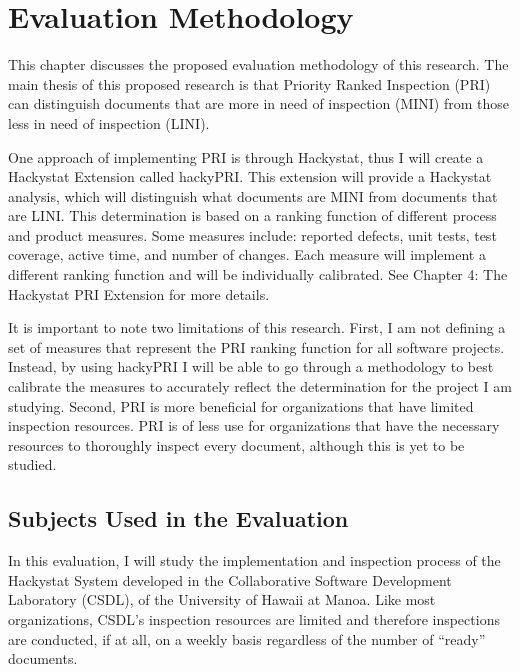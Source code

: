 

\chapter{Evaluation Methodology}
\label{chapter:evaluation}
This chapter discusses the proposed evaluation methodology of this
research. The main thesis of this proposed research is that Priority Ranked
Inspection (PRI) can distinguish documents that are more in need of
inspection (MINI) from those less in need of inspection (LINI).

One approach of implementing PRI is through Hackystat, thus I will create a
Hackystat Extension called hackyPRI. This extension will provide a
Hackystat analysis, which will distinguish what documents are MINI from
documents that are LINI.  This determination is based on a ranking function
of different process and product measures. Some measures include: reported
defects, unit tests, test coverage, active time, and number of changes.
Each measure will implement a different ranking function and will be
individually calibrated. See Chapter 4: The Hackystat PRI Extension for
more details.

It is important to note two limitations of this research. First, I am not
defining a set of measures that represent the PRI ranking function for
all software projects. Instead, by using hackyPRI I will be able to go
through a methodology to best calibrate the measures to accurately reflect
the determination for the project I am studying. Second, PRI is more
beneficial for organizations that have limited inspection resources. PRI is
of less use for organizations that have the necessary resources to
thoroughly inspect every document, although this is yet to be studied.


\section{Subjects Used in the Evaluation}
In this evaluation, I will study the implementation and inspection process
of the Hackystat System developed in the Collaborative Software Development
Laboratory (CSDL), of the University of Hawaii at Manoa. Like most
organizations, CSDL's inspection resources are limited and therefore
inspections are conducted, if at all, on a weekly basis regardless of the
number of ``ready'' documents. 

